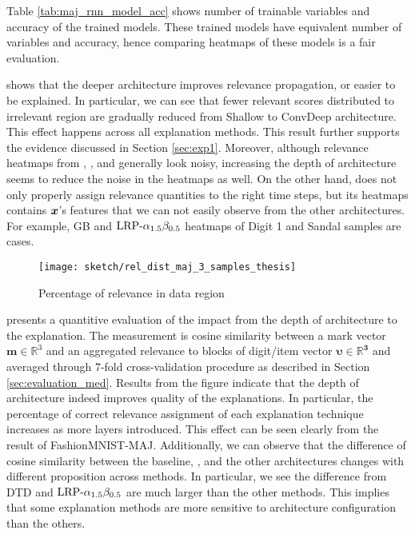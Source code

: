 Table \ref{tab:maj_rnn_model_acc} shows number of trainable variables and accuracy of the trained models. These trained models have equivalent number of variables and accuracy, hence comparing heatmaps of these models is a fair evaluation.

\addfigure{\ref{fig:heatmap_msc_mix_for_thesis}} shows that the deeper architecture improves relevance propagation, or easier to be explained. In particular, we can see that fewer relevant scores distributed to irrelevant region are gradually reduced from Shallow to ConvDeep architecture. This effect happens across all explanation methods. This result further supports the evidence discussed in Section \ref{sec:exp1}.  Moreover, although relevance heatmaps from , , and  generally look noisy, increasing the depth of architecture seems to reduce the noise in the heatmaps as well.   On the other hand,  does not  only properly assign relevance quantities to the right time steps, but its heatmaps contains $\boldsymbol{x}$'s features that we can not easily observe from the other architectures. For example, GB and $\text{LRP-}\alpha_{1.5}\beta_{0.5}$ heatmaps of Digit 1 and Sandal samples are cases.

\clearpage

 \begin{figure}[!hbt]
\centering
\texttt{[image: sketch/rel\_dist\_maj\_3\_samples\_thesis]}
\caption{Percentage of relevance in data region} 
\label{fig:rel_dist_maj_3_samples_thesis}
\end{figure}

\addfigure{\ref{fig:rel_dist_maj_3_samples_thesis}} presents a quantitive  evaluation of the impact from the depth of architecture to the explanation. The measurement is cosine similarity between a mark vector $\boldsymbol{m} \in \mathbb{R}^3$ and an aggregated relevance to blocks of digit/item vector $\boldsymbol{\upsilon \in \mathbb{R}^3 }$ and averaged through $7$-fold cross-validation procedure as described in Section \ref{sec:evaluation_med}. Results from the figure indicate that the depth of architecture indeed improves quality of the explanations. In particular, the percentage of correct relevance assignment of each explanation technique increases as more layers introduced. This effect can be seen clearly from the result of FashionMNIST-MAJ. Additionally, we can observe that the difference of cosine similarity between the baseline, , and the other  architectures changes with different proposition across methods. In particular, we see the difference from DTD and $\text{LRP-}\alpha_{1.5}\beta_{0.5}$ are much larger than the other methods. This implies that some explanation methods are more sensitive to architecture configuration than the others.


